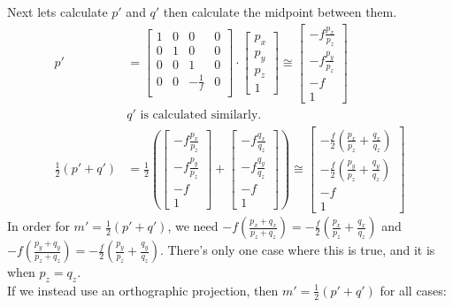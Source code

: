 \documentclass{article} %
\begin{document}
Next lets calculate $p'$ and $q'$ then calculate the midpoint between them.
\begin{align*}
p' &=
\begin{bmatrix}
1 & 0 & 0 & 0\\
0 & 1 & 0 & 0\\
0 & 0 & 1 & 0\\
0 & 0 & -\frac{1}{f} & 0\\
\end{bmatrix}
\cdot
\begin{bmatrix}
p_x\\
p_y\\
p_z\\
1
\end{bmatrix}
\cong
\begin{bmatrix}
-f\frac{p_x}{p_z}\\
-f\frac{p_y}{p_z}\\
-f\\
1
\end{bmatrix}\\
&\text{$q'$ is calculated similarly.}\\
\frac{1}{2}\left(p'+q'\right) &=
\frac{1}{2}
\left(
\begin{bmatrix}
-f\frac{p_x}{p_z}\\
-f\frac{p_y}{p_z}\\
-f\\
1
\end{bmatrix}
+
\begin{bmatrix}
-f\frac{q_x}{q_z}\\
-f\frac{q_y}{q_z}\\
-f\\
1
\end{bmatrix}
\right)
\cong
\begin{bmatrix}
-\frac{f}{2}\left(\frac{p_x}{p_z} + \frac{q_x}{q_z}\right)\\
-\frac{f}{2}\left(\frac{p_y}{p_z} + \frac{q_y}{q_z}\right)\\
-f\\
1
\end{bmatrix}
\end{align*}
In order for $m' = \frac{1}{2}(p'+q')$, we need $-f\left(\frac{p_x + q_x}{p_z + q_z}\right) = -\frac{f}{2}\left(\frac{p_x}{p_z} + \frac{q_x}{q_z}\right)$ and $-f\left(\frac{p_y + q_y}{p_z + q_z}\right) = -\frac{f}{2}\left(\frac{p_y}{p_z} + \frac{q_y}{q_z}\right)$. There's only one case where this is true, and it is when $p_z = q_z$.
\\
If we instead use an orthographic projection, then $m' = \frac{1}{2}(p'+q')$ for all cases:
\end{document}
